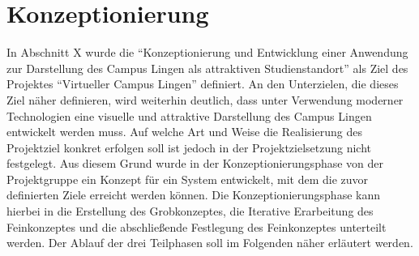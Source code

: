 \section{Konzeptionierung}
\label{sec:Konzeptionierung}

In Abschnitt X wurde die "`Konzeptionierung und Entwicklung
einer Anwendung zur Darstellung des Campus Lingen als attraktiven
Studienstandort"' als Ziel des Projektes "`Virtueller Campus Lingen"'
definiert. An den Unterzielen, die dieses Ziel näher definieren, wird weiterhin
deutlich, dass unter Verwendung moderner Technologien eine visuelle und
attraktive Darstellung des Campus Lingen entwickelt werden muss. Auf welche Art
und Weise die Realisierung des Projektziel konkret erfolgen soll ist jedoch in
der Projektzielsetzung nicht festgelegt. Aus diesem Grund wurde in der
Konzeptionierungsphase von der Projektgruppe ein Konzept für ein System
entwickelt, mit dem die zuvor definierten Ziele erreicht werden können. Die
Konzeptionierungsphase kann hierbei in die Erstellung des Grobkonzeptes, die
Iterative Erarbeitung des Feinkonzeptes und die abschließende Festlegung des
Feinkonzeptes unterteilt werden. Der Ablauf der drei Teilphasen soll im
Folgenden näher erläutert werden.





